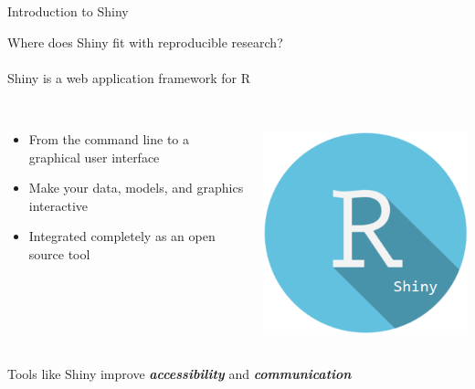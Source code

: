 \documentclass[serif]{beamer}\usepackage[]{graphicx}\usepackage[]{color}
\newcommand{\emtxt}[1]{\textbf{\textit{#1}}}
\begin{document}
\begin{frame}{Introduction to Shiny}

Where does Shiny fit with reproducible research? \\~\\
Shiny is a web application framework for R \\~\\
\begin{columns}
\begin{column}{0.7\textwidth}
\begin{itemize}
\item From the command line to a graphical user interface 
\item Make your data, models, and graphics interactive 
\item Integrated completely as an open source tool \\~\\
\end{itemize}
\end{column}
\begin{column}{0.2\textwidth}
\centerline{\includegraphics[width = \textwidth]{fig/shiny_logo.png}}
\end{column}
\end{columns}
\vspace{0.16in}
Tools like Shiny improve \emtxt{accessibility} and \emtxt{communication} 
\end{frame}
\end{document}
